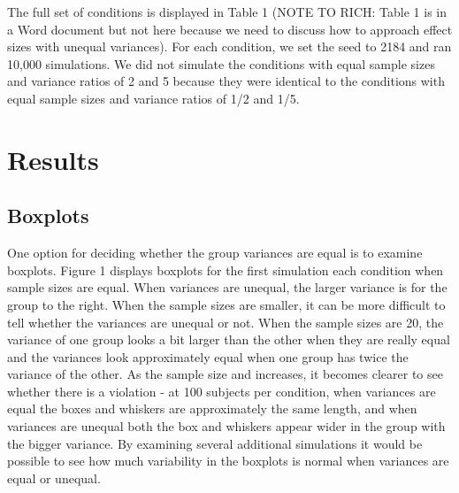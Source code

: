 \documentclass[man,a4paper,noextraspace]{apa6}\usepackage[]{graphicx}\usepackage[]{color}
\begin{document}
    The full set of conditions is displayed in Table 1 (NOTE TO RICH: Table 1 is in a Word document but not here because we need to discuss how to approach effect sizes with unequal variances). For each condition, we set the seed to 2184 and ran 10,000 simulations. We did not simulate the conditions with equal sample sizes and variance ratios of 2 and 5 because they were identical to the conditions with equal sample sizes and variance ratios of 1/2 and 1/5. 

\section{Results}    

\subsection{Boxplots} One option for deciding whether the group variances are equal is to examine boxplots. Figure 1 displays boxplots for the first simulation each condition when sample sizes are equal. When variances are unequal, the larger variance is for the group to the right. When the sample sizes are smaller, it can be more difficult to tell whether the variances are unequal or not. When the sample sizes are 20, the variance of one group looks a bit larger than the other when they are really equal and the variances look approximately equal when one group has twice the variance of the other. As the sample size and increases, it becomes clearer to see whether there is a violation - at 100 subjects per condition, when variances are equal the boxes and whiskers are approximately the same length, and when variances are unequal both the box and whiskers appear wider in the group with the bigger variance. By examining several additional simulations it would be possible to see how much variability in the boxplots is normal when variances are equal or unequal.
   
\end{document}
